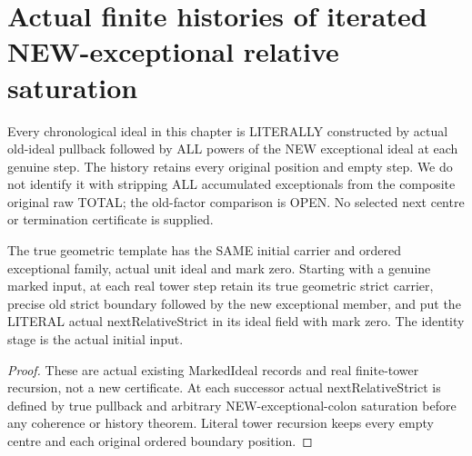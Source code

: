 \section{Actual finite histories of iterated NEW-exceptional relative saturation}

Every chronological ideal in this chapter is LITERALLY constructed by actual
old-ideal pullback followed by ALL powers of the NEW exceptional ideal at
each genuine step. The history retains every original position and empty
step. We do not identify it with stripping ALL accumulated exceptionals
from the composite original raw TOTAL; the old-factor comparison is OPEN.
No selected next centre or termination certificate is supplied.

\begin{definition}
\label{hir:sharp-actual-finite-chronological-history-objects}
\leanok
The true geometric template has the SAME initial carrier and ordered
exceptional family, actual unit ideal and mark zero. Starting with a genuine
marked input, at each real tower step retain its true geometric strict
carrier, precise old strict boundary followed by the new exceptional member,
and put the LITERAL actual nextRelativeStrict in its ideal field with mark
zero. The identity stage is the actual initial input.
\end{definition}
\begin{proof}
These are actual existing MarkedIdeal records and real finite-tower recursion,
not a new certificate. At each successor actual nextRelativeStrict is defined
by true pullback and arbitrary NEW-exceptional-colon saturation before any
coherence or history theorem. Literal tower recursion keeps every empty
centre and each original ordered boundary position.
\end{proof}

